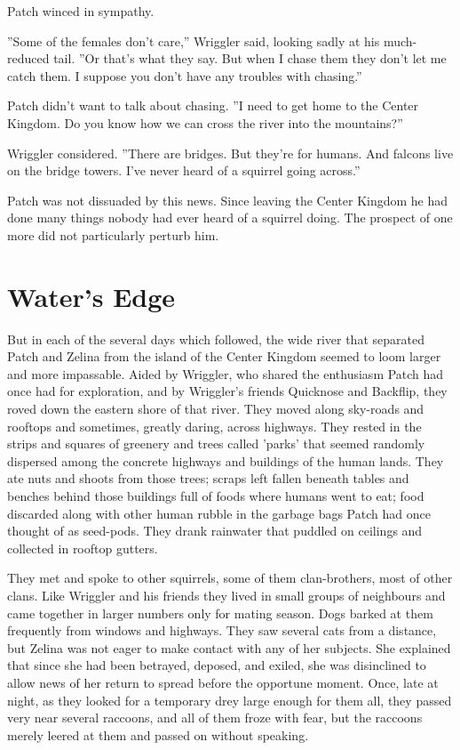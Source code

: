 \documentclass[12pt]{book}
\begin{document}
Patch winced in sympathy.

''Some of the females don't care,'' Wriggler said, looking sadly at
his much-reduced tail. ''Or that's what they say. But when I chase
them they don't let me catch them. I suppose you don't have any
troubles with chasing.''

Patch didn't want to talk about chasing. ''I need to get home to the
Center Kingdom. Do you know how we can cross the river into the
mountains?''

Wriggler considered. ''There are bridges. But they're for humans. And
falcons live on the bridge towers. I've never heard of a squirrel
going across.''

Patch was not dissuaded by this news. Since leaving the Center Kingdom
he had done many things nobody had ever heard of a squirrel doing. The
prospect of one more did not particularly perturb him.


\section{Water's Edge}

But in each of the several days which followed, the wide river that
separated Patch and Zelina from the island of the Center Kingdom
seemed to loom larger and more impassable. Aided by Wriggler, who
shared the enthusiasm Patch had once had for exploration, and by
Wriggler's friends Quicknose and Backflip, they roved down the eastern
shore of that river. They moved along sky-roads and rooftops and
sometimes, greatly daring, across highways. They rested in the strips
and squares of greenery and trees called 'parks' that seemed randomly
dispersed among the concrete highways and buildings of the human
lands. They ate nuts and shoots from those trees; scraps left fallen
beneath tables and benches behind those buildings full of foods where
humans went to eat; food discarded along with other human rubble in
the garbage bags Patch had once thought of as seed-pods. They drank
rainwater that puddled on ceilings and collected in rooftop gutters.

They met and spoke to other squirrels, some of them clan-brothers,
most of other clans. Like Wriggler and his friends they lived in small
groups of neighbours and came together in larger numbers only for
mating season. Dogs barked at them frequently from windows and
highways. They saw several cats from a distance, but Zelina was not
eager to make contact with any of her subjects. She explained that
since she had been betrayed, deposed, and exiled, she was disinclined
to allow news of her return to spread before the opportune
moment. Once, late at night, as they looked for a temporary drey large
enough for them all, they passed very near several raccoons, and all
of them froze with fear, but the raccoons merely leered at them and
passed on without speaking.
\end{document}
